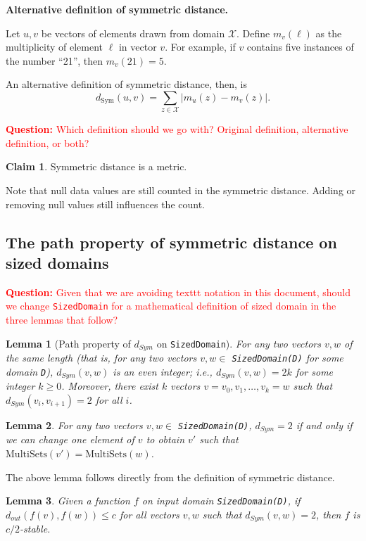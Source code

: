 \documentclass[11pt,a4paper]{article}
\newtheorem{lemma}{Lemma}[section]
\theoremstyle{definition}
\newtheorem{claim}{Claim}
\newcommand{\MultiSet}{\mathrm{MultiSets}}
\newcommand{\dout}{d_{out}}
\newcommand{\questionc}[1]{\textcolor{red}{\textbf{Question:} #1}}
\begin{document}
\medskip
\textbf{Alternative definition of symmetric distance.}

Let $u,v$ be vectors of elements drawn from domain $\mathcal{X}$. Define $m_v(\ell)$ as the multiplicity of element $\ell$ in vector $v$. For example, if $v$ contains five instances of the number ``21'', then $m_v(21) = 5$.

An alternative definition of symmetric distance, then, is $$d_{\text{Sym}}(u,v) = \sum_{z\in \mathcal{X}} |m_u(z) - m_v(z)|.$$

\questionc{Which definition should we go with? Original definition, alternative definition, or both?}

\begin{claim}
Symmetric distance is a metric.
\end{claim}

Note that null data values are still counted in the symmetric distance. Adding or removing null values still influences the count.

\subsection{The path property of symmetric distance on sized domains}

\questionc{Given that we are avoiding texttt notation in this document, should we change \texttt{SizedDomain} for a mathematical definition of sized domain in the three lemmas that follow?}

\begin{lemma}[Path property of $d_{Sym}$ on \texttt{SizedDomain}]
    For any two vectors $v, w$ of the same length (that is, for any two vectors $v, w \in$ \texttt{SizedDomain(D)} for some domain \texttt{D}), $d_{Sym}(v,w)$ is an even integer; i.e., $d_{Sym}(v,w) = 2k$ for some integer $k \geq 0$. Moreover, there exist $k$ vectors $v=v_0, v_1, \ldots, v_k=w$ such that $d_{Sym}(v_i,v_{i+1})=2$ for all $i$.
\end{lemma}

\begin{lemma}
    For any two vectors $v, w \in$ \texttt{SizedDomain(D)}, $d_{Sym} = 2$ if and only if we can change one element of $v$ to obtain $v'$ such that $\MultiSet(v') = \MultiSet(w)$.
\end{lemma}

The above lemma follows directly from the definition of symmetric distance. 

\begin{lemma}
Given a function $f$ on input domain \texttt{SizedDomain(D)}, if $\dout(f(v), f(w)) \leq c$ for all vectors $v, w$ such that $d_{Sym}(v, w) = 2$, then $f$ is $c/2$-stable.
\end{lemma}
\end{document}
